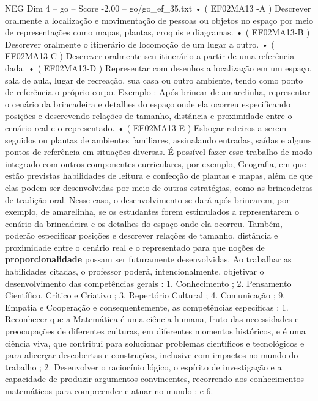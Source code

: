 \begin{textsample}{NEG Dim 4 – go – Score -2.00 – go/go\_ef\_35.txt}  \label{ex:f4_neg_230}
• ( EF02MA13 -A ) Descrever oralmente a localização e movimentação de pessoas ou objetos no espaço por meio de representações como mapas, plantas, croquis e diagramas. • ( EF02MA13-B ) Descrever oralmente o itinerário de locomoção de um lugar a outro. • ( EF02MA13-C ) Descrever oralmente seu itinerário a partir de uma referência dada. • ( EF02MA13-D ) Representar com desenhos a localização em um espaço, sala de aula, lugar de recreação, sua casa ou outro ambiente, tendo como ponto de referência o próprio corpo.
Exemplo : Após brincar de amarelinha, representar o cenário da brincadeira e detalhes do espaço onde ela ocorreu especificando posições e descrevendo relações de tamanho, distância e proximidade entre o cenário real e o representado. • ( EF02MA13-E ) Esboçar roteiros a serem seguidos ou plantas de ambientes familiares, assinalando entradas, saídas e alguns pontos de referência em situações diversas.
É possível fazer esse trabalho de modo integrado com outros componentes curriculares, por exemplo, Geografia, em que estão previstas habilidades de leitura e confecção de plantas e mapas, além de que elas podem ser desenvolvidas por meio de outras estratégias, como as brincadeiras de tradição oral.
Nesse caso, o desenvolvimento se dará após brincarem, por exemplo, de amarelinha, se os estudantes forem estimulados a representarem o cenário da brincadeira e os detalhes do espaço onde ela ocorreu.
Também, poderão especificar posições e descrever relações de tamanho, distância e proximidade entre o cenário real e o representado para que noções de \textbf{proporcionalidade} possam ser futuramente desenvolvidas.
Ao trabalhar as habilidades citadas, o professor poderá, intencionalmente, objetivar o desenvolvimento das competências gerais : 1.
Conhecimento ; 2.
Pensamento Científico, Crítico e Criativo ; 3.
Repertório Cultural ; 4.
Comunicação ; 9.
Empatia e Cooperação e consequentemente, as competências específicas : 1.
Reconhecer que a Matemática é uma ciência humana, fruto das necessidades e preocupações de diferentes culturas, em diferentes momentos históricos, e é uma ciência viva, que contribui para solucionar problemas científicos e tecnológicos e para alicerçar descobertas e construções, inclusive com impactos no mundo do trabalho ; 2.
Desenvolver o raciocínio lógico, o espírito de investigação e a capacidade de produzir argumentos convincentes, recorrendo aos conhecimentos matemáticos para compreender e atuar no mundo ; e 6.

\end{textsample}
